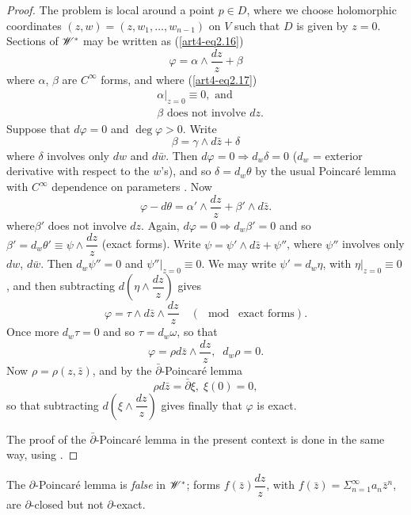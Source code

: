 \begin{proof}
The problem is local around a point $p \in D$, where we choose holomorphic coordinates $(z, w ) = (z, w_1, \ldots , w_{n-1})$ on $V$ such that $D$ is given by $z=0$. Sections of $\mathscr{W}^\ast$ may be written as  (\cf \eqref{art4-eq2.16})
$$
\varphi = \alpha \wedge \frac{dz}{z} + \beta
$$
where $\alpha$, $\beta$ are $C^\infty$ forms, and where (\cf \eqref{art4-eq2.17})
\begin{align*}
& \alpha|_{z=0} \equiv 0, \text{ and }\\
& \beta \text{ does not involve } dz.
\end{align*}
Suppose that $d\varphi = 0$ and $\deg \varphi > 0$. Write 
$$
\beta = \gamma \wedge d \bar{z}  + \delta 
$$
where $\delta$ involves only $dw$ and $d \bar{w}$. Then $d\varphi = 0 \Rightarrow d_w \delta = 0$ ($d_w$ = exterior derivative with respect to the $w$'s), and so $\delta = d_w \theta$ by the usual Poincar\'e lemma with $C^\infty$ dependence on parameters \cite{art4-key16}. Now
$$
\varphi - d\theta = \alpha' \wedge \frac{dz}{z} + \beta' \wedge d \bar{z}.
$$
where\pageoriginale $\beta'$ does not involve $dz$. Again, $d\varphi=0 \Rightarrow d_w \beta' =0$ and so $\beta' = d_w \theta' \equiv \psi \wedge \dfrac{dz}{z}$ (\mod exact forms). Write $\psi = \psi' \wedge d \bar{z} + \psi''$, where $\psi''$ involves only $dw$, $d\bar{w}$. Then $d_w \psi'' =0$ and $\psi'' |_{z=0} \equiv 0$. We may write $\psi' = d_w \eta$, with $\eta |_{z=0} \equiv 0$ \cite{art4-key16}, and then subtracting $d \left(\eta \wedge \dfrac{dz}{z} \right)$ gives
$$
\varphi = \tau \wedge d\bar{z} \wedge \frac{dz}{z} \quad  (\mod \text{ exact forms}).
$$
Once more $d_w \tau = 0$ and so $\tau = d_w \omega$, so that
$$
\varphi = \rho d \bar{z} \wedge \frac{dz}{z}, \;\; d_w \rho =0.
$$
Now $\rho = \rho (z, \bar{z})$, and by the $\bar{\partial}$-Poincar\'e lemma \cite{art4-key39}
$$
\rho d \bar{z} = \bar{\partial} \xi, \; \xi (0) = 0,
$$
so that subtracting $d \left(\xi \wedge \dfrac{dz}{z} \right)$ gives finally that $\varphi$ is exact.

The proof of the $\bar{\partial}$-Poincar\'e lemma in the present context is done in the same way, using \cite{art4-key39}.
\end{proof}

\begin{remark*}
The $\partial$-Poincar\'e lemma is \textit{false} in $\mathscr{W}^\ast$; forms $f(\bar{z}) \dfrac{dz}{z}$, with $f (\bar{z})= \Sigma^{\infty}_{n=1} a_n \bar{z}^n$, are $\partial$-closed but not $\partial$-exact.
\end{remark*}

